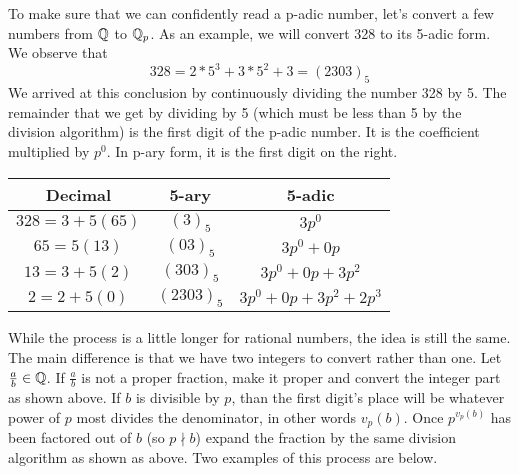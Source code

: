 \documentclass[a4paper]{article}
\begin{document}
To make sure that we can confidently read a p-adic number, let's 
convert a few numbers from \(\mathbb Q\) to $\mathbb Q_p$.  As an example, we 
will convert 328 to its 5-adic form.  We observe that
\[
	328=2*5^3+3*5^2+3=(2303)_5
\]
We arrived at this conclusion by continuously dividing the number 328 
by 5.  The remainder that we get by dividing by 5 (which must be less 
than 5 by the division algorithm) is the first digit of the p-adic
number.  It is the coefficient multiplied by $p^0$.  In p-ary form, it
is the first digit on the right.

\begin{center}
  \begin{tabular}{|c|c|c|}
    \hline
      Decimal & 5-ary & 5-adic\\
    \hline
      $328=3+5(65)$ & $(3)_5$ & $3p^0$\\
      $65=5(13)$ & $(03)_5$ & $3p^0+0p$\\
      $13=3+5(2)$ & $(303)_5$ & $3p^0+0p+3p^2$\\
      $2=2+5(0)$ & $(2303)_5$ & $3p^0+0p+3p^2+2p^3$\\
    \hline
  \end{tabular}
\end{center}

While the process is a little longer for rational numbers, the idea is 
still the same.  The main difference is that we have two integers to
convert rather than one.  Let $\frac{a}{b}\in\mathbb Q$.  If $\frac{a}{b}$
is not a proper fraction, make it proper and convert the integer part as
shown above.  If $b$ is divisible by $p$, than the first digit's place
will be whatever power of $p$ most divides the denominator, in other
words $v_p(b)$.  Once $p^{v_p(b)}$ has been factored out of $b$ (so
$p\nmid b$) expand the fraction by the same division algorithm as shown
as above.  Two examples of this process are below.
\end{document}
